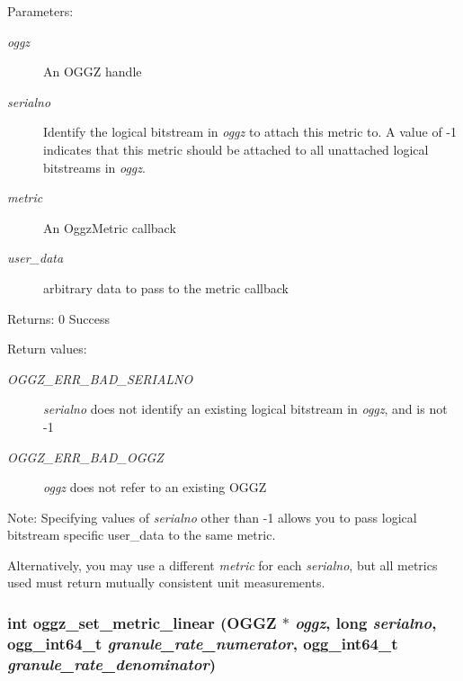 \begin{Desc}
\item[Parameters:]
\begin{description}
\item[{\em oggz}]An OGGZ handle \item[{\em serialno}]Identify the logical bitstream in {\em oggz\/} to attach this metric to. A value of -1 indicates that this metric should be attached to all unattached logical bitstreams in {\em oggz\/}. \item[{\em metric}]An Oggz\-Metric callback \item[{\em user\_\-data}]arbitrary data to pass to the metric callback\end{description}
\end{Desc}
\begin{Desc}
\item[Returns:]0 Success \end{Desc}
\begin{Desc}
\item[Return values:]
\begin{description}
\item[{\em OGGZ\_\-ERR\_\-BAD\_\-SERIALNO}]{\em serialno\/} does not identify an existing logical bitstream in {\em oggz\/}, and is not -1 \item[{\em OGGZ\_\-ERR\_\-BAD\_\-OGGZ}]{\em oggz\/} does not refer to an existing OGGZ\end{description}
\end{Desc}
\begin{Desc}
\item[Note:]Specifying values of {\em serialno\/} other than -1 allows you to pass logical bitstream specific user\_\-data to the same metric. 

Alternatively, you may use a different {\em metric\/} for each {\em serialno\/}, but all metrics used must return mutually consistent unit measurements. \end{Desc}
\subsubsection{\setlength{\rightskip}{0pt plus 5cm}int oggz\_\-set\_\-metric\_\-linear ({\bf OGGZ} $\ast$ {\em oggz}, long {\em serialno}, ogg\_\-int64\_\-t {\em granule\_\-rate\_\-numerator}, ogg\_\-int64\_\-t {\em granule\_\-rate\_\-denominator})}\label{group__seeking__group_a1}


